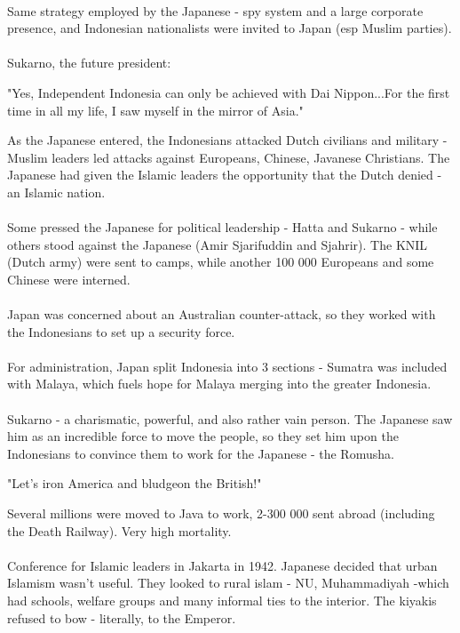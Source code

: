 \documentclass[a4paper]{article}
\begin{document}
\\
Same strategy employed by the Japanese - spy system and a large corporate presence, and Indonesian nationalists were invited to Japan (esp Muslim parties).\\
\\
Sukarno, the future president:
\begin{displayquote}
	"Yes, Independent Indonesia can only be achieved with Dai Nippon...For the first time in all my life, I saw myself in the mirror of Asia."
\end{displayquote}
As the Japanese entered, the Indonesians attacked Dutch civilians and military - Muslim leaders led attacks against Europeans, Chinese, Javanese Christians. The Japanese had given the Islamic leaders the opportunity that the Dutch denied - an Islamic nation.\\
\\
Some pressed the Japanese for political leadership - Hatta and Sukarno - while others stood against the Japanese (Amir Sjarifuddin and Sjahrir). The KNIL (Dutch army) were sent to camps, while another 100 000 Europeans and some Chinese were interned.\\
\\
Japan was concerned about an Australian counter-attack, so they worked with the Indonesians to set up a security force.\\
\\
For administration, Japan split Indonesia into 3 sections - Sumatra was included with Malaya, which fuels hope for Malaya merging into the greater Indonesia.\\
\\
Sukarno - a charismatic, powerful, and also rather vain person. The Japanese saw him as an incredible force to move the people, so they set him upon the Indonesians to convince them to work for the Japanese - the Romusha.
\begin{displayquote}
	"Let's iron America and bludgeon the British!"
\end{displayquote}
Several millions were moved to Java to work, 2-300 000 sent abroad (including the Death Railway). Very high mortality.\\
\\
Conference for Islamic leaders in Jakarta in 1942. Japanese decided that urban Islamism wasn't useful. They looked to rural islam - NU, Muhammadiyah -which had schools, welfare groups and many informal ties to the interior. The kiyakis refused to bow - literally, to the Emperor.\\
\end{document}
